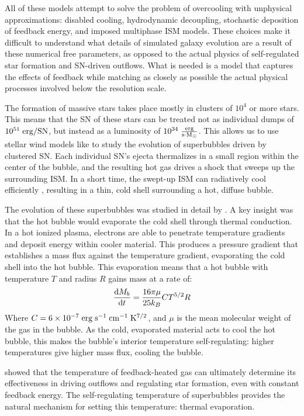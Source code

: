 All of these models attempt to solve the problem of overcooling with unphysical
approximations: disabled cooling, hydrodynamic decoupling, stochastic deposition
of feedback energy, and imposed multiphase ISM models.  These choices make it
difficult to understand what details of simulated galaxy evolution are a result
of these numerical free parameters, as opposed to the actual physics of
self-regulated star formation and SN-driven outflows.  What is needed is a model that
captures the effects of feedback while matching as closely as possible the
actual physical processes involved below the resolution scale.

The formation of massive stars takes place mostly in clusters of $10^4$ or more
stars.  This means that the SN of these stars can be treated not as
individual dumps of $10^{51}\;\rm{erg/SN}$, but instead as a luminosity of
$10^{34}\;\rm{\frac{erg}{s \cdot M_\odot}}$.  This allows us to use stellar wind
models like \citet{Weaver1977} to study the evolution of superbubbles driven by
clustered SN.  Each individual SN's ejecta thermalizes in a small
region within the center of the bubble, and the resulting hot gas drives a shock
that sweeps up the surrounding ISM.  In a short time, the swept-up ISM can
radiatively cool efficiently , resulting in a thin, cold shell surrounding a
hot, diffuse bubble.

The evolution of these superbubbles was studied in detail by \citet{MacLow1988}.
A key insight was that the hot bubble would evaporate the cold shell through
thermal conduction.  In a hot ionized plasma, electrons are able to penetrate
temperature gradients and deposit energy within cooler material.  This produces
a pressure gradient that establishes a mass flux against the temperature
gradient, evaporating the cold shell into the hot bubble.  This
evaporation means that a hot bubble with temperature $T$ and radius $R$ gains
mass at a rate of:
\begin{equation}
    \frac{{\rm d }M_b}{{\rm d}t} = \frac{16\pi\mu}{25k_B} CT^{5/2}R
\end{equation}
Where $C=6\times10^{-7}\;\rm{erg\;s^{-1}\;cm^{-1}\;K^{7/2}}$, and $\mu$ is the
mean molecular weight of the gas in the bubble.  As the cold, evaporated
material acts to cool the hot bubble, this makes the bubble's interior
temperature self-regulating: higher temperatures give higher mass flux, cooling
the bubble.

\citet{DallaVecchia2012} showed that the temperature of feedback-heated gas can
ultimately determine its effectiveness in driving outflows and regulating star
formation, even with constant feedback energy.  The self-regulating temperature
of superbubbles provides the natural mechanism for setting this temperature:
thermal evaporation.

